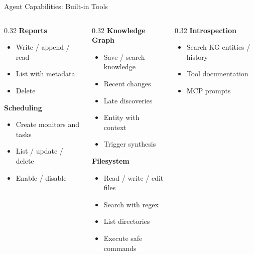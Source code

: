 \documentclass[aspectratio=169,10pt]{beamer}
\begin{document}
\begin{frame}{Agent Capabilities: Built-in Tools}
\begin{columns}[T]
\begin{column}{0.32\textwidth}
\textbf{\color{rhred}Reports}
\begin{itemize}\scriptsize\setlength{\itemsep}{0pt}
  \item Write / append / read
  \item List with metadata
  \item Delete
\end{itemize}

\smallskip
\textbf{\color{rhblue}Scheduling}
\begin{itemize}\scriptsize\setlength{\itemsep}{0pt}
  \item Create monitors and tasks
  \item List / update / delete
  \item Enable / disable
\end{itemize}
\end{column}
\begin{column}{0.32\textwidth}
\textbf{\color{rhgreen}Knowledge Graph}
\begin{itemize}\scriptsize\setlength{\itemsep}{0pt}
  \item Save / search knowledge
  \item Recent changes
  \item Late discoveries
  \item Entity with context
  \item Trigger synthesis
\end{itemize}

\smallskip
\textbf{\color{rhorange}Filesystem}
\begin{itemize}\scriptsize\setlength{\itemsep}{0pt}
  \item Read / write / edit files
  \item Search with regex
  \item List directories
  \item Execute safe commands
\end{itemize}
\end{column}
\begin{column}{0.32\textwidth}
\textbf{\color{rhpurple}Introspection}
\begin{itemize}\scriptsize\setlength{\itemsep}{0pt}
  \item Search KG entities / history
  \item Tool documentation
  \item MCP prompts
\end{itemize}


\end{column}
\end{columns}
\end{frame}
\end{document}
